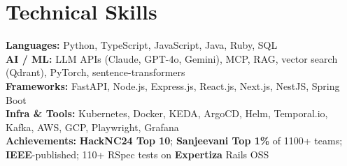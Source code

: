 \documentclass[9pt]{extarticle}
\begin{document}
\section{Technical Skills}
 \begin{itemize}[leftmargin=0.15in, label={}]
    \small{\item{
     \textbf{Languages:} Python, TypeScript, JavaScript, Java, Ruby, SQL \\ \vspace{1pt}
     \textbf{AI / ML:} LLM APIs (Claude, GPT-4o, Gemini), MCP, RAG, vector search (Qdrant), PyTorch, sentence-transformers \\ \vspace{1pt}
     \textbf{Frameworks:} FastAPI, Node.js, Express.js, React.js, Next.js, NestJS, Spring Boot \\ \vspace{1pt}
     \textbf{Infra \& Tools:} Kubernetes, Docker, KEDA, ArgoCD, Helm, Temporal.io, Kafka, AWS, GCP, Playwright, Grafana \\ \vspace{1pt}
     \textbf{Achievements:} \textbf{HackNC24 Top 10}; \textbf{Sanjeevani Top 1\%} of 1100+ teams; \textbf{IEEE}-published; 110+ RSpec tests on \textbf{Expertiza} Rails OSS
    }}
 \end{itemize}

\end{document}
